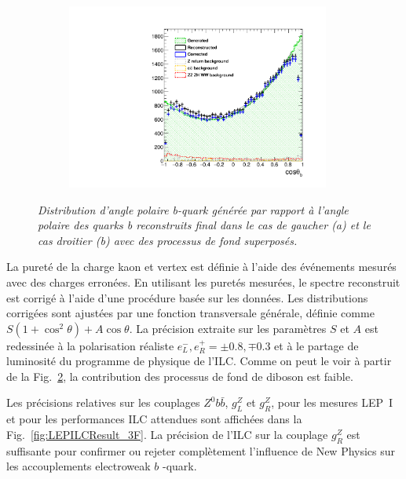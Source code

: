 \begin{figure}
\begin{subfigure}{0.5\textwidth}
		\centering
		\includegraphics[width=0.95\textwidth]{ILD/plots/basymmetry-final-right.pdf}
		\caption{\label{fig:BAsymmetryFinal_b_3F} }
	\end{subfigure}
	\caption{\sl Distribution d'angle polaire b-quark générée par rapport à l'angle polaire des quarks b reconstruits final dans le cas de gaucher (a) et le cas droitier (b) avec des processus de fond superposés.}
	\label{fig:BAsymmetryFinal_3F}
\end{figure}

La pureté de la charge kaon et vertex est définie à l'aide des événements mesurés avec des charges erronées. En utilisant les puretés mesurées, le spectre reconstruit est corrigé à l'aide d'une procédure basée sur les données.
Les distributions corrigées sont ajustées par une fonction transversale générale, définie comme $S(1+\cos^2\theta) + A\cos\theta$. La précision extraite sur les paramètres $S$ et $A$ est redessinée à la polarisation réaliste $e^-_L, e^+_R = \pm 0.8, \mp 0.3$ et à le partage de luminosité du programme de physique de l'ILC.
Comme on peut le voir à partir de la Fig.~\ref{fig:BAsymmetryFinal_3F}, la contribution des processus de fond de diboson est faible.


Les précisions relatives sur les couplages $Z^0 b\bar{b}$, $g_L^Z$ et $g_R^Z$, pour les mesures LEP~I et pour les performances ILC attendues sont affichées dans la Fig.~\ref{fig:LEPILCResult_3F}.
La précision de l'ILC sur la couplage $g_R^Z$ est suffisante pour confirmer ou rejeter complètement l'influence de New Physics sur les accouplements electroweak $b$ -quark.

